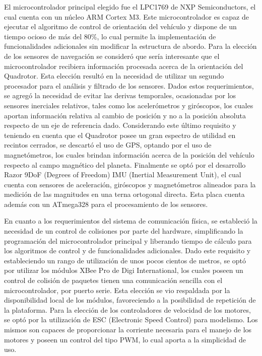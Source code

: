 \documentclass[conference]{IEEEtran}
\begin{document}
El microcontrolador principal elegido fue el LPC1769 de NXP Semiconductors, el cual cuenta con un núcleo ARM Cortex M3.  Este microcontrolador es capaz de ejecutar el algoritmo de control de orientación del vehículo y dispone de un tiempo ocioso de más del 80\%, lo cual permite la implementación de funcionalidades  adicionales sin modificar la estructura de abordo.
Para la elección de los sensores de navegación se consideró que sería interesante que el microcontrolador recibiera información procesada acerca de la orientación del Quadrotor. Esta elección resultó en la necesidad de utilizar un segundo procesador para el análisis y filtrado de los sensores. Dados estos requerimientos, se agregó la necesidad de evitar las derivas temporales, ocasionadas por los sensores inerciales relativos, tales como los acelerómetros y giróscopos, los cuales aportan información relativa al cambio de posición y no a la posición absoluta respecto de un eje de referencia dado. Considerando este último requisito y teniendo en cuenta que el Quadrotor posee un gran espectro de utilidad en recintos cerrados, se descartó el uso de GPS, optando por el uso de magnetómetros, los cuales brindan información acerca de la posición del vehículo respecto al campo magnético del planeta. Finalmente se optó por el desarrollo Razor 9DoF (Degrees of Freedom) IMU (Inertial Measurement Unit), el cual cuenta con sensores de aceleración, giróscopos y magnetómetros alineados para la medición de las magnitudes en una terna ortogonal directa. Esta placa cuenta además con un ATmega328 para el procesamiento de los sensores.

En cuanto a los requerimientos del sistema de comunicación física, se estableció la necesidad de un control de colisiones por parte del hardware, simplificando la programación del microcontrolador principal y liberando tiempo de cálculo para los algoritmos de control y de funcionalidades adicionales. Dado este requisito y estableciendo un rango de utilización de unos pocos cientos de metros, se optó por utilizar los módulos XBee Pro de Digi International, los cuales poseen un control de colisión de paquetes tienen una comunicación sencilla con el microcontrolador, por puerto serie. Esta elección se vio respaldada por la disponibilidad local de los módulos, favoreciendo a la posibilidad de repetición de la plataforma.
Para la elección de los controladores de velocidad de los motores, se optó por la utilización de ESC (Electronic Speed Control) para modelismo. Los mismos son capaces de proporcionar la corriente necesaria para el manejo de los motores y poseen un control del tipo PWM, lo cual aporta a la simplicidad de uso. 
\end{document}
